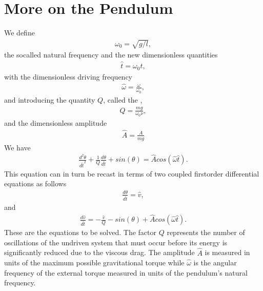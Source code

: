 \documentclass[letterpaper,10pt,english]{sphinxmanual}
\begin{document}
\section{More on the Pendulum}
\label{\detokenize{chapter1:id1}}
We define
\begin{equation*}
\begin{split}
\omega_0=\sqrt{g/l},
\end{split}
\end{equation*}
the so\sphinxhyphen{}called natural frequency and the new dimensionless quantities
\begin{equation*}
\begin{split}
\hat{t}=\omega_0t,
\end{split}
\end{equation*}
with the dimensionless driving frequency
\begin{equation*}
\begin{split}
\hat{\omega}=\frac{\omega}{\omega_0},
\end{split}
\end{equation*}
and introducing the quantity \(Q\), called the ,
\begin{equation*}
\begin{split}
Q=\frac{mg}{\omega_0\nu},
\end{split}
\end{equation*}
and the dimensionless amplitude
\begin{equation*}
\begin{split}
\hat{A}=\frac{A}{mg}
\end{split}
\end{equation*}
We have
\begin{equation*}
\begin{split}
\frac{d^2\theta}{d\hat{t}^2}+\frac{1}{Q}\frac{d\theta}{d\hat{t}}  
     +sin(\theta)=\hat{A}cos(\hat{\omega}\hat{t}).
\end{split}
\end{equation*}
This equation can in turn be recast in terms of two coupled first\sphinxhyphen{}order differential equations as follows
\begin{equation*}
\begin{split}
\frac{d\theta}{d\hat{t}}=\hat{v},
\end{split}
\end{equation*}
and
\begin{equation*}
\begin{split}
\frac{d\hat{v}}{d\hat{t}}=-\frac{\hat{v}}{Q}-sin(\theta)+\hat{A}cos(\hat{\omega}\hat{t}).
\end{split}
\end{equation*}
These are the equations to be solved.  The factor \(Q\) represents the number of oscillations of the undriven system that must occur before  its energy is significantly reduced due to the viscous drag. The  amplitude \(\hat{A}\) is measured in units of the maximum possible  gravitational torque while \(\hat{\omega}\) is the angular frequency of the external torque measured in units of the pendulum’s natural frequency.
\end{document}
